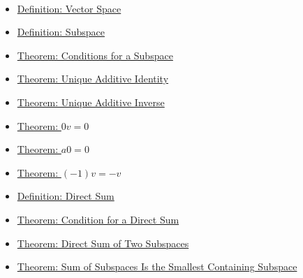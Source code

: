 \begin{remark*}[Dependencies]~\\
\begin{itemize}
  \item \hyperref[def:vector-space]{Definition: Vector Space}
  \item \hyperref[def:subspace]{Definition: Subspace}
  \item \hyperref[thm:conditions-for-a-subspace]{Theorem: Conditions for a Subspace}
  \item \hyperref[thm:unique-additive-identity]{Theorem: Unique Additive Identity}
  \item \hyperref[thm:unique-additive-inverse]{Theorem: Unique Additive Inverse}
  \item \hyperref[thm:zero-scalar-times-vector]{Theorem: $0v=0$}
  \item \hyperref[thm:scalar-times-zero-vector]{Theorem: $a0=0$}
  \item \hyperref[thm:minus-one-times-vector]{Theorem: $(-1)v=-v$}
  \item \hyperref[def:direct-sum]{Definition: Direct Sum}
  \item \hyperref[thm:condition-for-direct-sum]{Theorem: Condition for a Direct Sum}
  \item \hyperref[thm:direct-sum-of-two-subspaces]{Theorem: Direct Sum of Two Subspaces}
  \item \hyperref[thm:sum-of-subspaces-smallest-containing]{Theorem: Sum of Subspaces Is the Smallest Containing Subspace}
\end{itemize}
\end{remark*}
